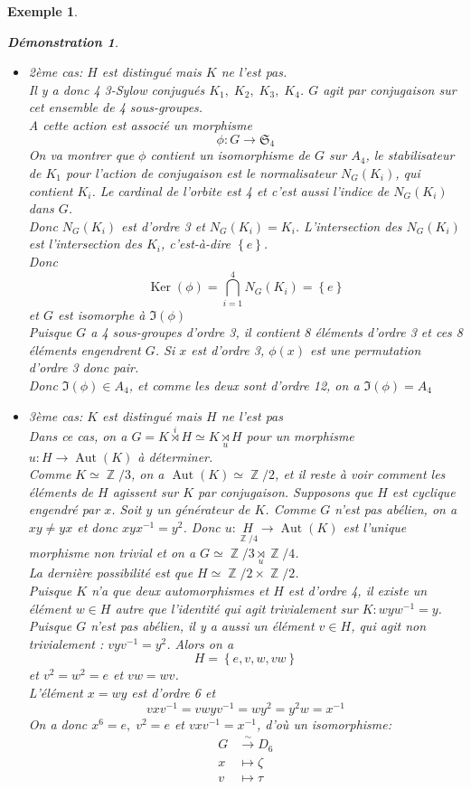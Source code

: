 \documentclass[a4paper, oneside]{report}
\theoremstyle{break}
\newtheorem{exemple}[thm]{Exemple}
\newtheorem*{demonstration}{Démonstration}
\newcommand{\fong}{\overset{\sim}{\rightarrow}}
\DeclareMathOperator{\Z}{\mathbb{Z}}
\DeclarePairedDelimiter\ens{\left\{ }{\right\} }%
\DeclareMathOperator{\Ker}{Ker}
\DeclareMathOperator{\Aut}{Aut}
\renewcommand{\ens}[1]{\left\{ #1 \right\} }%
\newcommand{\us}{\underset}
\newcommand{\os}{\overset}
\begin{document}
\begin{exemple}
\begin{demonstration}
\begin{itemize}
\item 2ème cas: $H$ est distingué mais $K$ ne l'est pas.\\
Il y a donc 4 3-Sylow conjugués $K_1, \; K_2, \; K_3, \; K_4$. $G$ agit par conjugaison sur cet ensemble de 4 sous-groupes.\\
A cette action est associé un morphisme
\[
\phi : G \longrightarrow \mathfrak{S}_4
\]
On va montrer que $\phi$ contient un isomorphisme de $G$ sur $A_4$, le stabilisateur de $K_1$ pour l'action de conjugaison est le normalisateur $N_G(K_i)$, qui contient $K_i$. Le cardinal de l'orbite est 4 et c'est aussi l'indice de $N_G(K_i)$ dans $G$.\\
Donc $N_G(K_i)$ est d'ordre 3 et $N_G(K_i) = K_i$. L'intersection des $N_G(K_i)$ est l'intersection des $K_i$, c'est-à-dire $\ens{e}$.\\
Donc 
\[
\Ker(\phi) = \bigcap_{i = 1}^4 N_G(K_i) = \ens{e}
\]
et $G$ est isomorphe à $\Im(\phi)$\\
Puisque $G$ a 4 sous-groupes d'ordre 3, il contient 8 éléments d'ordre 3 et ces 8 éléments engendrent $G$. Si $x$ est d'ordre 3, $\phi(x)$ est une permutation d'ordre 3 donc pair.\\
Donc $\Im(\phi) \in A_4$, et comme les deux sont d'ordre 12, on a $\Im(\phi) = A_4$

\item 3ème cas: $K$ est distingué mais $H$ ne l'est pas\\
Dans ce cas, on a $G = K \os{i}{\rtimes} H \simeq K \us{u}{\rtimes} H$ pour un morphisme $u : H \longrightarrow \Aut(K)$ à déterminer.\\
Comme $K \simeq \Z/3$, on a $\Aut(K) \simeq \Z/2$, et il reste à voir comment les éléments de $H$ agissent sur $K$ par conjugaison. Supposons que $H$ est cyclique engendré par $x$. Soit $y$ un générateur de $K$. Comme $G$ n'est pas abélien, on a $xy \neq yx$ et donc $xyx^{-1} = y^2$. Donc $u : \us{\Z/4}{H} \longrightarrow \Aut(K)$ est l'unique morphisme non trivial et on a $G \simeq \Z/3 \us{u}{\rtimes} \Z/4$.\\
La dernière possibilité est que $H \simeq \Z/2 \times \Z/2$.\\
Puisque $K$ n'a que deux automorphismes et $H$ est d'ordre 4, il existe un élément $w \in H$ autre que l'identité qui agit trivialement sur $K : wyw^{-1} = y$.\\
Puisque $G$ n'est pas abélien, il y a aussi un élément $v \in H$, qui agit non trivialement : $vyv^{-
1} = y^2$. Alors on a 
\[
H = \ens{e, v, w, vw}
\]
et $v^2 = w^2 = e$ et $vw = wv$.\\
L'élément $x = wy$ est d'ordre 6 et
\[
vxv^{-1} = vwyv^{-1} = wy^2 = y^2w = x^{-1}
\]
On a donc $x^6 = e, \; v^2 = e$ et $vxv^{-1} = x^{-1}$, d'où un isomorphisme:
\begin{align*}
G &\fong D_6
\\
x &\mapsto \zeta
\\
v &\mapsto \tau
\end{align*}
\end{itemize}
~
\end{demonstration}


\end{exemple}
\end{document}
